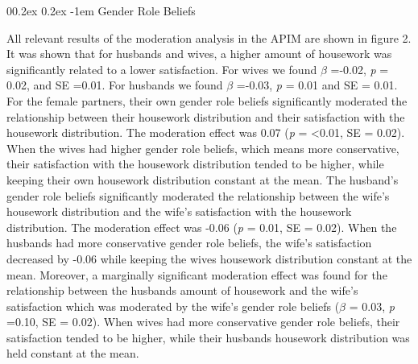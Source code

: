 \documentclass[
  man,floatsintext]{apa6}
\makeatletter
\let\oldparagraph\paragraph
\renewcommand{\paragraph}[1]{\oldparagraph{#1}\mbox{}}
\renewcommand{\paragraph}{\@startsection{paragraph}{4}{\parindent}%
  {0\baselineskip \@plus 0.2ex \@minus 0.2ex}%
  {-1em}%
  {\normalfont\normalsize\bfseries\itshape\typesectitle}}
\makeatother
\begin{document}
\hypertarget{gender-role-beliefs-1}{%
\paragraph{Gender Role Beliefs}\label{gender-role-beliefs-1}}

All relevant results of the moderation analysis in the APIM are shown in figure 2. It was shown that for husbands and wives, a higher amount of housework was significantly related to a lower satisfaction. For wives we found \(\beta\) =-0.02, \emph{p} = 0.02, and SE =0.01. For husbands we found \(\beta\) =-0.03, \emph{p} = 0.01 and SE = 0.01.
For the female partners, their own gender role beliefs significantly moderated the relationship between their housework distribution and their satisfaction with the housework distribution. The moderation effect was 0.07 (\emph{p} = \textless0.01, SE = 0.02). When the wives had higher gender role beliefs, which means more conservative, their satisfaction with the housework distribution tended to be higher, while keeping their own housework distribution constant at the mean. The husband's gender role beliefs significantly moderated the relationship between the wife's housework distribution and the wife's satisfaction with the housework distribution. The moderation effect was -0.06 (\emph{p} = 0.01, SE = 0.02). When the husbands had more conservative gender role beliefs, the wife's satisfaction decreased by -0.06 while keeping the wives housework distribution constant at the mean. Moreover, a marginally significant moderation effect was found for the relationship between the husbands amount of housework and the wife's satisfaction which was moderated by the wife's gender role beliefs (\(\beta\) = 0.03, \emph{p} =0.10, SE = 0.02). When wives had more conservative gender role beliefs, their satisfaction tended to be higher, while their husbands housework distribution was held constant at the mean.
\end{document}
